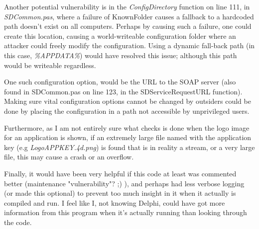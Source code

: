 Another potential vulnerability is in the \textit{ConfigDirectory} function on line 111, in \textit{SDCommon.pas}, where a failure of KnownFolder causes a fallback to a hardcoded path doesn't exist on all computers. Perhaps by causing such a failure, one could create this location, causing a world-writeable configuration folder where an attacker could freely modify the configuration. Using a dynamic fall-back path (in this case, \textit{\%APPDATA\%}) would have resolved this issue; although this path would be writeable regardless.

One such configuration option, would be the URL to the SOAP server (also found in SDCommon.pas on line 123, in the SDServiceRequestURL function). Making sure vital configuration options cannot be changed by outsiders could be done by placing the configuration in a path not accessible by unprivileged users.

Furthermore, as I am not entirely sure what checks is done when the logo image for an application is shown, if an extremely large file named with the application key (e.g \textit{LogoAPPKEY.4d.png}) is found that is in reality a stream, or a very large file, this may cause a crash or an overflow.

Finally, it would have been very helpful if this code at least was commented better (maintenance "vulnerability"? ;) ), and perhaps had less verbose logging (or made this optional) to prevent too much insight in it when it actually is compiled and run. I feel like I, not knowing Delphi, could have got more information from this program when it's actually running than looking through the code.